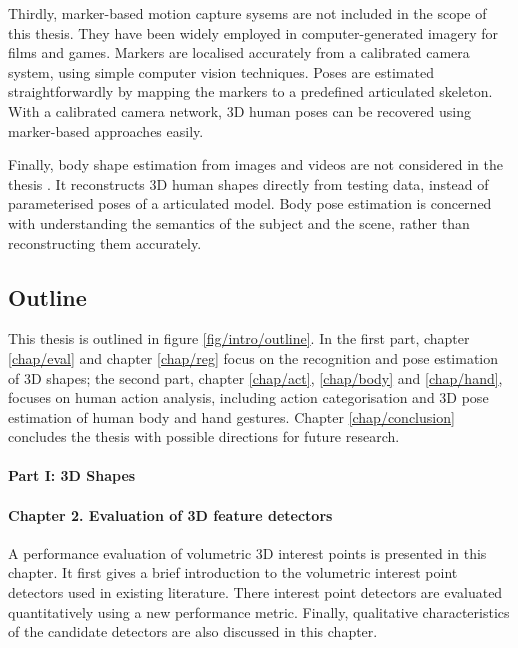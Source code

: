 Thirdly, marker-based motion capture sysems are not included in the scope of this thesis. They have been widely employed in computer-generated imagery for films and games. Markers are localised accurately from a calibrated camera system, using simple computer vision techniques. Poses are estimated straightforwardly by mapping the markers to a predefined articulated skeleton.
 With a calibrated camera network, 3D human poses can be recovered using marker-based approaches easily.  

Finally, body shape estimation from images and videos are not considered in the thesis \cite{Guan2009, Rother2009, Chen2011}. It reconstructs 3D human shapes directly from testing data, instead of parameterised poses of a articulated model. Body pose estimation is concerned with understanding the semantics of the subject and the scene, rather than reconstructing them accurately. 

\subsection{Outline}

This thesis is outlined in figure \ref{fig/intro/outline}. In the first part, chapter \ref{chap/eval} and chapter \ref{chap/reg} focus on the recognition and pose estimation of 3D shapes; the second part, chapter \ref{chap/act}, \ref{chap/body} and \ref{chap/hand}, focuses on human action analysis, including action categorisation and 3D pose estimation of human body and hand gestures. Chapter \ref{chap/conclusion} concludes the thesis with possible directions for future research. 

\paragraph{Part I: 3D Shapes}


\paragraph{Chapter 2. Evaluation of 3D feature detectors} 
A performance evaluation of volumetric 3D interest points is presented in this chapter. 
It first gives a brief introduction to the volumetric interest point detectors used in existing literature.
There interest point detectors are evaluated quantitatively using a new performance metric.
Finally, qualitative characteristics of the candidate detectors are also discussed in this chapter. 

